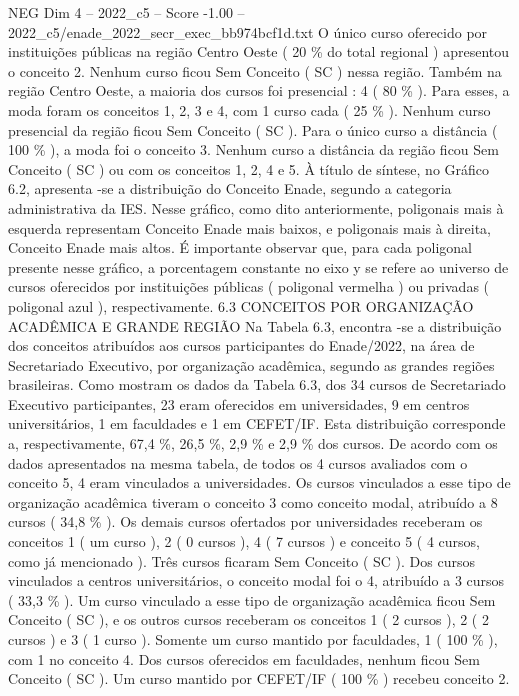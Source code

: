 \begin{textsample}{NEG Dim 4 – 2022\_c5 – Score -1.00 – 2022\_c5/enade\_2022\_secr\_exec\_bb974bcf1d.txt}
O único curso oferecido por instituições públicas na região Centro Oeste ( 20 \% do total regional ) apresentou o conceito 2.
Nenhum curso ficou Sem Conceito ( SC ) nessa região.
Também na região Centro Oeste, a maioria dos cursos foi presencial : 4 ( 80 \% ).
Para esses, a moda foram os conceitos 1, 2, 3 e 4, com 1 curso cada ( 25 \% ).
Nenhum curso presencial da região ficou Sem Conceito ( SC ).
Para o único curso a distância ( 100 \% ), a moda foi o conceito 3.
Nenhum curso a distância da região ficou Sem Conceito ( SC ) ou com os conceitos 1, 2, 4 e 5.
À título de síntese, no Gráfico 6.2, apresenta -se a distribuição do Conceito Enade, segundo a categoria administrativa da IES.
Nesse gráfico, como dito anteriormente, poligonais mais à esquerda representam Conceito Enade mais baixos, e poligonais mais à direita, Conceito Enade mais altos.
É importante observar que, para cada poligonal presente nesse gráfico, a porcentagem constante no eixo y se refere ao universo de cursos oferecidos por instituições públicas ( poligonal vermelha ) ou privadas ( poligonal azul ), respectivamente. 6.3 CONCEITOS POR ORGANIZAÇÃO ACADÊMICA E GRANDE REGIÃO Na Tabela 6.3, encontra -se a distribuição dos conceitos atribuídos aos cursos participantes do Enade/2022, na área de Secretariado Executivo, por organização acadêmica, segundo as grandes regiões brasileiras.
Como mostram os dados da Tabela 6.3, dos 34 cursos de Secretariado Executivo participantes, 23 eram oferecidos em universidades, 9 em centros universitários, 1 em faculdades e 1 em CEFET/IF.
Esta distribuição corresponde a, respectivamente, 67,4 \%, 26,5 \%, 2,9 \% e 2,9 \% dos cursos.
De acordo com os dados apresentados na mesma tabela, de todos os 4 cursos avaliados com o conceito 5, 4 eram vinculados a universidades.
Os cursos vinculados a esse tipo de organização acadêmica tiveram o conceito 3 como conceito modal, atribuído a 8 cursos ( 34,8 \% ).
Os demais cursos ofertados por universidades receberam os conceitos 1 ( um curso ), 2 ( 0 cursos ), 4 ( 7 cursos ) e conceito 5 ( 4 cursos, como já mencionado ).
Três cursos ficaram Sem Conceito ( SC ).
Dos cursos vinculados a centros universitários, o conceito modal foi o 4, atribuído a 3 cursos ( 33,3 \% ).
Um curso vinculado a esse tipo de organização acadêmica ficou Sem Conceito ( SC ), e os outros cursos receberam os conceitos 1 ( 2 cursos ), 2 ( 2 cursos ) e 3 ( 1 curso ).
Somente um curso mantido por faculdades, 1 ( 100 \% ), com 1 no conceito 4.
Dos cursos oferecidos em faculdades, nenhum ficou Sem Conceito ( SC ).
Um curso mantido por CEFET/IF ( 100 \% ) recebeu conceito 2.

\end{textsample}
